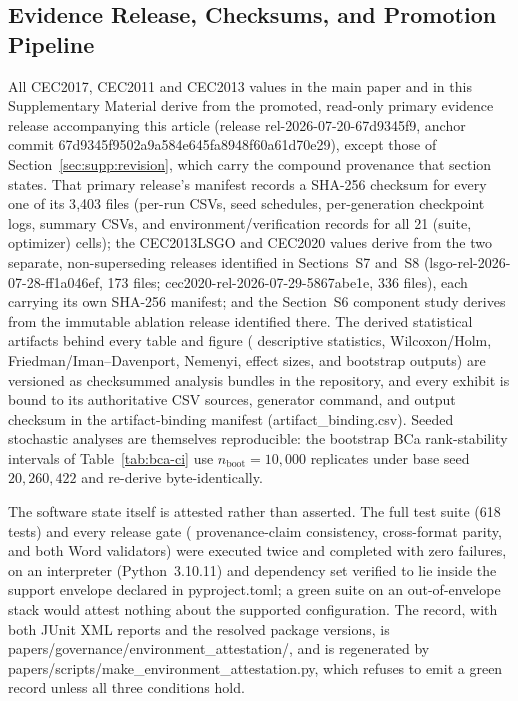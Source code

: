 \documentclass[algorithms,article,submit,moreauthors,pdftex]{Definitions/mdpi}
\begin{document}
\subsection{Evidence Release, Checksums, and Promotion Pipeline}\label{sec:repro:release}

All CEC2017, CEC2011 and CEC2013 values in the main paper and in this
Supplementary Material derive from the promoted, read-only primary
evidence release accompanying this article (release
rel-2026-07-20-67d9345f9, anchor commit
67d9345f9502a9a584e645fa8948f60a61d70e29), except those of
Section~\ref{sec:supp:revision}, which carry the compound provenance that
section states.  That primary release's manifest
records a SHA-256 checksum for every one of its 3{,}403 files (per-run
CSVs, seed schedules, per-generation checkpoint logs, summary CSVs, and
environment/verification records for all 21 (suite, optimizer) cells);
the CEC2013LSGO and CEC2020 values derive from the two separate,
non-superseding releases identified in Sections~S7 and~S8
(lsgo-rel-2026-07-28-ff1a046ef, 173 files;
cec2020-rel-2026-07-29-5867abe1e, 336 files), each carrying its own
SHA-256 manifest; and the Section~S6 component study derives from the
immutable ablation release identified there.
The derived statistical artifacts behind every table and figure (%
descriptive statistics, Wilcoxon/Holm, Friedman/Iman--Davenport,
Nemenyi, effect sizes, and bootstrap outputs) are versioned as
checksummed analysis bundles in the repository, and every exhibit is
bound to its authoritative CSV
sources, generator command, and output checksum in
the artifact-binding manifest (artifact\_binding.csv).
Seeded stochastic analyses are themselves reproducible: the bootstrap
BCa rank-stability intervals of Table~\ref{tab:bca-ci} use
$n_{\text{boot}} = 10{,}000$ replicates under
base seed $20{,}260{,}422$ and re-derive byte-identically.

The software state itself is attested rather than asserted.  The full test
suite (618 tests) and every release gate (%
provenance-claim consistency, cross-format parity, and both Word validators)
were executed twice and completed with zero failures, on an interpreter
(Python~3.10.11) and dependency set verified to lie inside the support
envelope declared in pyproject.toml; a green suite on an
out-of-envelope stack would attest nothing about the supported configuration.
The record, with both JUnit XML reports and the resolved package versions, is
papers/governance/environment\_attestation/, and is regenerated by
papers/scripts/make\_environment\_attestation.py, which refuses to
emit a green record unless all three conditions hold.
\end{document}
